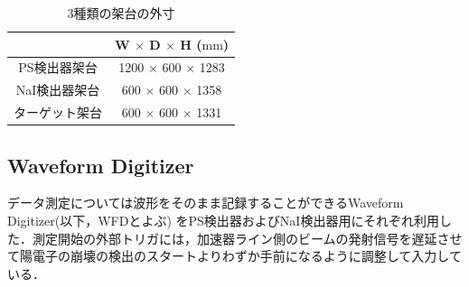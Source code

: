       \begin{table}[H]
      \caption{3種類の架台の外寸}
      \label{tab:kadai}
      \centering
      \begin{tabular}{|c|c|}\hline
        &  W $\times$ D $\times$ H ($\mathrm{mm}$)\\ \hline
        PS検出器架台 &  1200 $\times$ 600 $\times$ 1283\\ \hline
        NaI検出器架台 & 600 $\times$ 600 $\times$ 1358 \\ \hline
        ターゲット架台 & 600 $\times$ 600 $\times$ 1331 \\ \hline
      \end{tabular}
    \end{table}

\subsection{Waveform Digitizer}
データ測定については波形をそのまま記録することができるWaveform Digitizer(以下，WFDとよぶ) をPS検出器およびNaI検出器用にそれぞれ利用した．測定開始の外部トリガには，加速器ライン側のビームの発射信号を遅延させて陽電子の崩壊の検出のスタートよりわずか手前になるように調整して入力している．
